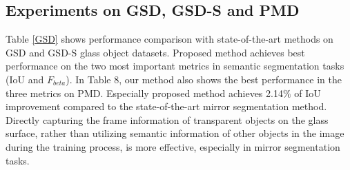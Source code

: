 \documentclass[10pt,twocolumn,letterpaper]{article}
\begin{document}


\subsection{Experiments on GSD, GSD-S and PMD}
Table \ref{GSD} shows performance comparison with state-of-the-art methods on GSD and GSD-S glass object datasets. Proposed method achieves best performance on the two most important metrics in semantic segmentation tasks (IoU and ${F}_{beta}$).
In Table 8, our method also shows the best performance in the three metrics on PMD. Especially proposed method achieves 2.14$\%$ of IoU improvement compared to the state-of-the-art mirror segmentation method. Directly capturing the frame information of transparent objects on the glass surface, rather than utilizing semantic information of other objects in the image during the training process, is more effective, especially in mirror segmentation tasks. 
\end{document}
